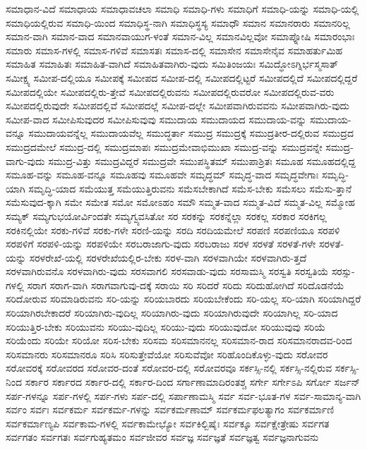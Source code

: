 {ಸಮಾಧಾನ-ವಿದೆ
ಸಮಾಧಾಯ
ಸಮಾಧಾವಚಲಾ
ಸಮಾಧಿ
ಸಮಾಧಿ-ಗಳು
ಸಮಾಧಿಗೆ
ಸಮಾಧಿ-ಯನ್ನು
ಸಮಾಧಿ-ಯಲ್ಲಿ
ಸಮಾಧಿಯಲ್ಲಿರುವ
ಸಮಾಧಿ-ಯಿಂದ
ಸಮಾಧಿಸ್ಥ-ನಾಗಿ
ಸಮಾಧಿಸ್ಥಸ್ಯ
ಸಮಾಧೌ
ಸಮಾನ
ಸಮಾನರಾರು
ಸಮಾನರಿಲ್ಲ
ಸಮಾನ-ವಾಗಿ
ಸಮಾನ-ವಾದ
ಸಮಾನವಾಯುಗ-ಳಂತೆ
ಸಮಾನ-ವಿಲ್ಲ
ಸಮಾನವಿಲ್ಲವೋ
ಸಮಾಪ್ನೋಷಿ
ಸಮಾರಂಭಾಃ
ಸಮಾರು
ಸಮಾಸ-ಗಳಲ್ಲಿ
ಸಮಾಸ-ಗಳಿವೆ
ಸಮಾಸತಃ
ಸಮಾಸ-ದಲ್ಲಿ
ಸಮಾಸೇನ
ಸಮಾಸೇನೈವ
ಸಮಾಹರ್ತುಮಿಹ
ಸಮಾಹಿತ
ಸಮಾಹಿತಃ
ಸಮಾಹಿತ-ವಾಗಿದೆ
ಸಮಾಹಿತವಾಗಿರು-ವುದು
ಸಮಿತಿಂಜಯಃ
ಸಮಿದ್ಧೋಽಗ್ನಿರ್ಭಸ್ಮಸಾತ್
ಸಮೀಕ್ಷ್ಯ
ಸಮೀಪ-ದಲ್ಲಿಯೂ
ಸಮೀಪಕ್ಕೆ
ಸಮೀಪದ
ಸಮೀಪ-ದಲ್ಲಿ
ಸಮೀಪದಲ್ಲಿಟ್ಟರೆ
ಸಮೀಪದಲ್ಲಿದೆ
ಸಮೀಪದಲ್ಲಿದ್ದರೆ
ಸಮೀಪದಲ್ಲಿಯೇ
ಸಮೀಪದಲ್ಲಿರು-ತ್ತೇವೆ
ಸಮೀಪದಲ್ಲಿರುವನು
ಸಮೀಪದಲ್ಲಿರುವರೋ
ಸಮೀಪದಲ್ಲಿರುವ-ವರು
ಸಮೀಪದಲ್ಲಿರುವುದೇ
ಸಮೀಪದಲ್ಲಿವೆ
ಸಮೀಪದಲ್ಲೆ
ಸಮೀಪ-ದಲ್ಲೇ
ಸಮೀಪವಾಗಿರುವವನು
ಸಮೀಪವಾಗಿರು-ವುದು
ಸಮೀಪ-ವಾದ
ಸಮೀಪಿಸುವುದರ
ಸಮೀಪಿಸುವುವು
ಸಮುದಾಯ
ಸಮುದಾಯದ
ಸಮುದಾಯ-ವನ್ನು
ಸಮುದಾಯ-ವನ್ನೂ
ಸಮುದಾಯವನ್ನೆಲ್ಲ
ಸಮುದಾಯವೆಲ್ಲ
ಸಮುದ್ಧರ್ತಾ
ಸಮುದ್ರ
ಸಮುದ್ರಕ್ಕೆ
ಸಮುದ್ರತೀರ-ದಲ್ಲಿರುವ
ಸಮುದ್ರದ
ಸಮುದ್ರದಮೇಲೆ
ಸಮುದ್ರ-ದಲ್ಲಿ
ಸಮುದ್ರಮಾಪಃ
ಸಮುದ್ರಮೇವಾಭಿಮುಖಾ
ಸಮುದ್ರ-ವನ್ನು
ಸಮುದ್ರವನ್ನೇ
ಸಮುದ್ರ-ವಾಗು-ವುದು
ಸಮುದ್ರ-ವಿತ್ತು
ಸಮುದ್ರವಿದ್ದರೆ
ಸಮುದ್ರವೇ
ಸಮುಪಸ್ಥಿತಮ್
ಸಮುಪಾಶ್ರಿತಃ
ಸಮೂಹ
ಸಮೂಹದಲ್ಲಿದ್ದ
ಸಮೂಹ-ವನ್ನು
ಸಮೂಹ-ವನ್ನೂ
ಸಮೂಹವು
ಸಮೂಹವೇ
ಸಮೃದ್ಧಮ್
ಸಮೃದ್ಧ-ವಾದ
ಸಮೃದ್ಧವೇಗಾಃ
ಸಮೃದ್ಧಿ-ಯಾಗಿ
ಸಮೃದ್ಧಿ-ಯಾದ
ಸಮೆಯುತ್ತ
ಸಮೆಯುತ್ತಿರುವನು
ಸಮೆಸಬೇಕಾಗಿದೆ
ಸಮೆಸ-ಬೇಕು
ಸಮೆಸಲು
ಸಮೆಸು-ತ್ತಾನೆ
ಸಮೆಸುವುದ-ಕ್ಕಾಗಿ
ಸಮೇ
ಸಮೇತ
ಸಮೋ
ಸಮೋಽಹಂ
ಸಮೌ
ಸಮ್ಮತ-ವಾದ
ಸಮ್ಮತ-ವಿದೆ
ಸಮ್ಮತ-ವಿಲ್ಲ
ಸಮ್ಮೋಹ
ಸಮ್ಯಕ್
ಸಮ್ಯಗುಭಯೋರ್ವಿಂದತೇ
ಸಮ್ಯಗ್ವ್ಯವಸಿತೋ
ಸರ
ಸರಕನ್ನು
ಸರಕನ್ನೆಲ್ಲಾ
ಸರಕಲ್ಲ
ಸರಕಾರ
ಸರಕಿಗಲ್ಲ
ಸರಕಿನಲ್ಲಿಯೇ
ಸರಕು-ಗಳಿವೆ
ಸರಕು-ಗಳೇ
ಸರಣಿ-ಯನ್ನು
ಸರದಿ
ಸರದಿಯಮೇಲೆ
ಸರಪಣಿ
ಸರಪಣಿಯೂ
ಸರಪಳಿ
ಸರಪಳಿಗೆ
ಸರಪಳಿ-ಯನ್ನು
ಸರಪಳಿಯೇ
ಸರಬರಾಜಾಗು-ವುದು
ಸರಬರಾಜು
ಸರಳ
ಸರಳತೆ
ಸರಳತೆ-ಗಳೇ
ಸರಳತೆ-ಯನ್ನು
ಸರಳರೇಖೆ-ಯಲ್ಲಿ
ಸರಳರೇಖೆಯಲ್ಲಿರ-ಬೇಕು
ಸರಳ-ವಾಗಿ
ಸರಳವಾಗಿಯೇ
ಸರಳವಾಗಿರು-ತ್ತದೆ
ಸರಳವಾಗಿರುವನೊ
ಸರಳವಾಗಿರು-ವುದು
ಸರಸವಾಗಲಿ
ಸರಸವಾಡು-ವುದು
ಸರಸಾಮಸ್ಮಿ
ಸರಸ್ವತಿ
ಸರಸ್ವತಿಯೆ
ಸರಸ್ಸು-ಗಳಲ್ಲಿ
ಸರಾಗ
ಸರಾಗ-ವಾಗಿ
ಸರಾಗವಾಗುವು-ದಕ್ಕೆ
ಸರಾಯಿ
ಸರಿ
ಸರಿದರೆ
ಸರಿದು
ಸರಿದುಹೋಗಿದೆ
ಸರಿದೊಡನೆಯೆ
ಸರಿದೋರುವ
ಸರಿಮಾಡಿರುವನು
ಸರಿ-ಯನ್ನು
ಸರಿಯಬಾರದು
ಸರಿಯಬೇಕೆಂದು
ಸರಿ-ಯಲ್ಲ
ಸರಿ-ಯಾಗಿ
ಸರಿಯಾಗಿದ್ದರೆ
ಸರಿಯಾಗಿರಬೇಕಾದರೆ
ಸರಿಯಾಗಿರು-ವುದಿಲ್ಲ
ಸರಿಯಾಗಿರು-ವುದು
ಸರಿಯಾಗಿರುವುದೇ
ಸರಿಯಾಗಿಲ್ಲ
ಸರಿ-ಯಾದ
ಸರಿಯುತ್ತಿರ-ಬೇಕು
ಸರಿಯುವನು
ಸರಿಯು-ವುದಿಲ್ಲ
ಸರಿಯು-ವುದು
ಸರಿಯುವುದೋ
ಸರಿಯುವುವು
ಸರಿಯೆ
ಸರಿಯೆಂದು
ಸರಿಯೇ
ಸರಿಯೋ
ಸರಿಸ-ಬೇಕು
ಸರಿಸಮ
ಸರಿಸಮಾನನಲ್ಲ
ಸರಿಸಮಾನ-ರಾದ
ಸರಿಸಮಾನರಾದವ-ರಿಂದ
ಸರಿಸಮಾನರು
ಸರಿಸಮಾನರೂ
ಸರಿಸಿ
ಸರಿಸುತ್ತೇವೆಯೋ
ಸರಿಸುವೆವೋ
ಸರಿಹೊಂದಿಕೊಳ್ಳು-ವುದು
ಸರೋವರ
ಸರೋವರಕ್ಕೆ
ಸರೋವರದ
ಸರೋವರ-ದಂತೆ
ಸರೋವರ-ದಲ್ಲಿ
ಸರೋವರವೂ
ಸರ್ಕಸ್ಸಿ-ನಲ್ಲಿ
ಸರ್ಕಸ್ಸಿ-ನಲ್ಲಿರುವ
ಸರ್ಕಸ್ಸಿ-ನಿಂದ
ಸರ್ಕಾರ
ಸರ್ಕಾರದ
ಸರ್ಕಾರ-ದಲ್ಲಿ
ಸರ್ಕಾರ-ದಿಂದ
ಸರ್ಗಾಣಾಮಾದಿರಂತಶ್ಚ
ಸರ್ಗೇ
ಸರ್ಗೇಽಪಿ
ಸರ್ಗೋ
ಸರ್ಜನ್
ಸರ್ಪ-ಗಳನ್ನೂ
ಸರ್ಪ-ಗಳಲ್ಲಿ
ಸರ್ಪ-ಗಳು
ಸರ್ಪ-ದಲ್ಲಿ
ಸರ್ಪಾಣಾಮಸ್ಮಿ
ಸರ್ವ
ಸರ್ವ-ಭೂತ-ಗಳ
ಸರ್ವ-ಸಾಮಾನ್ಯ-ವಾಗಿ
ಸರ್ವಂ
ಸರ್ವಃ
ಸರ್ವಕರ್ಮ
ಸರ್ವಕರ್ಮ-ಗಳನ್ನು
ಸರ್ವಕರ್ಮಣಾಮ್
ಸರ್ವಕರ್ಮಫಲತ್ಯಾಗಂ
ಸರ್ವಕರ್ಮಾಣಿ
ಸರ್ವಕರ್ಮಾಣ್ಯಪಿ
ಸರ್ವಕಾಮ-ಗಳಲ್ಲಿ
ಸರ್ವಕಾಮೇಭ್ಯೋ
ಸರ್ವಕಿಲ್ಬಿಷೈಃ
ಸರ್ವಕ್ಕೂ
ಸರ್ವಕ್ಷೇತ್ರೇಷು
ಸರ್ವಗತ
ಸರ್ವಗತಂ
ಸರ್ವಗತಃ
ಸರ್ವಗುಹ್ಯತಮಂ
ಸರ್ವಜೀವರ
ಸರ್ವಜ್ಞ
ಸರ್ವಜ್ಞತೆ
ಸರ್ವಜ್ಞತ್ವ
ಸರ್ವಜ್ಞನಾಗುವನು
}
